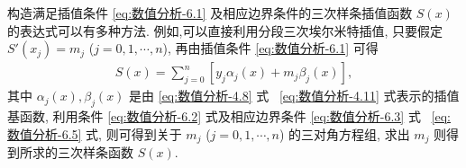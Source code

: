 \documentclass[../../main.tex]{subfiles}%
\begin{document}
\vspace{0.5cm}

构造满足插值条件 \eqref{eq:数值分析-6.1} 及相应边界条件的三次样条插值函数 $S(x)$ 的表达式可以有多种方法. 例如,可以直接利用分段三次埃尔米特插值, 只要假定 $S'(x_j) = m_j$ ($j = 0, 1, \cdots, n$), 再由插值条件 \eqref{eq:数值分析-6.1} 可得
\begin{align}
S(x) = \sum_{j=0}^n [ y_j \alpha_j(x) + m_j \beta_j(x) ], \label{eq:数值分析-6.6}
\end{align}
其中 $\alpha_j(x), \beta_j(x)$ 是由 \eqref{eq:数值分析-4.8} 式~ \eqref{eq:数值分析-4.11} 式表示的插值基函数, 利用条件 \eqref{eq:数值分析-6.2} 式及相应边界条件 \eqref{eq:数值分析-6.3} 式~ \eqref{eq:数值分析-6.5} 式, 则可得到关于 $m_j$ ($j = 0, 1, \cdots, n$) 的三对角方程组, 求出 $m_j$ 则得到所求的三次样条函数 $S(x)$.
\end{document}
